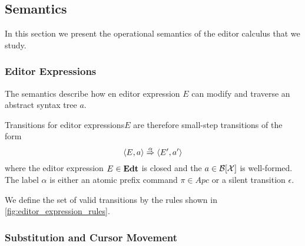 \documentclass[sigplan,screen]{acmart}
\begin{document}
\subsection{Semantics}

In this section we present the operational semantics of the editor
calculus that we study. 

\subsubsection{Editor Expressions} \label{sec:Semantics}

The semantics describe how en editor expression $E$
can modify and traverse an abstract syntax tree $a$.

Transitions for editor expressions$E$ are therefore small-step
transitions of the form
\[ \langle E, a \rangle \stackrel{\alpha}{\Rightarrow} \langle E', a' \rangle \] where the editor
expression $E \in \textbf{Edt}$ is closed and the \abt $a \in \mathcal{B}[\mathcal{X} ]$ is
well-formed. The label $\alpha$ is either an atomic prefix command
$\pi \in Apc$ or a silent transition $\epsilon$.

We define the set of valid transitions by the rules shown in
\cref{fig:editor_expression_rules}.


\subsubsection{Substitution and Cursor Movement}
\end{document}
